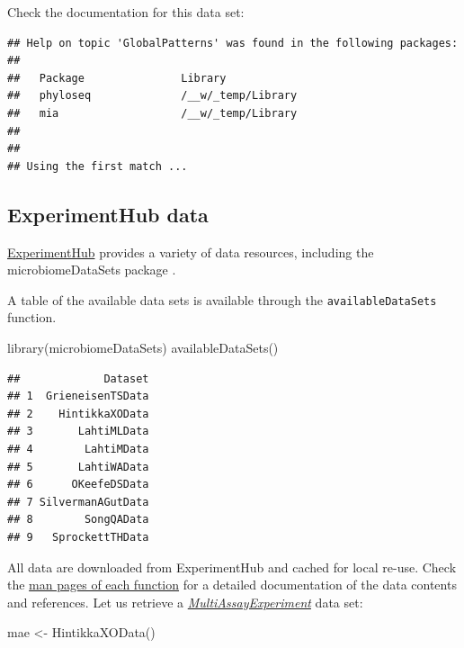 \documentclass[
]{book}
\newenvironment{Shaded}{\begin{snugshade}}{\end{snugshade}}
\newcommand{\FunctionTok}[1]{\textcolor[rgb]{0.00,0.00,0.00}{#1}}
\newcommand{\NormalTok}[1]{#1}
\newcommand{\OtherTok}[1]{\textcolor[rgb]{0.56,0.35,0.01}{#1}}
\begin{document}
Check the documentation for this data set:

\begin{verbatim}
## Help on topic 'GlobalPatterns' was found in the following packages:
## 
##   Package               Library
##   phyloseq              /__w/_temp/Library
##   mia                   /__w/_temp/Library
## 
## 
## Using the first match ...
\end{verbatim}

\hypertarget{experimenthub-data}{%
\subsection{ExperimentHub data}\label{experimenthub-data}}

\href{https://bioconductor.org/packages/release/bioc/vignettes/ExperimentHub/inst/doc/ExperimentHub.html}{ExperimentHub}
provides a variety of data resources, including the
microbiomeDataSets package \citep{Morgan2021, microlahti2021}.

A table of the available data sets is available through the \texttt{availableDataSets}
function.

\begin{Shaded}
\begin{Highlighting}[]
\FunctionTok{library}\NormalTok{(microbiomeDataSets)}
\FunctionTok{availableDataSets}\NormalTok{()}
\end{Highlighting}
\end{Shaded}

\begin{verbatim}
##             Dataset
## 1  GrieneisenTSData
## 2    HintikkaXOData
## 3       LahtiMLData
## 4        LahtiMData
## 5       LahtiWAData
## 6      OKeefeDSData
## 7 SilvermanAGutData
## 8        SongQAData
## 9   SprockettTHData
\end{verbatim}

All data are downloaded from ExperimentHub and cached for local
re-use. Check the \href{https://microbiome.github.io/microbiomeDataSets/reference/index.html}{man pages of each
function}
for a detailed documentation of the data contents and references. Let
us retrieve a \emph{\href{https://bioconductor.org/packages/3.15/MultiAssayExperiment}{MultiAssayExperiment}} data set:

\begin{Shaded}
\begin{Highlighting}[]
\NormalTok{mae }\OtherTok{\textless{}{-}} \FunctionTok{HintikkaXOData}\NormalTok{()}
\end{Highlighting}
\end{Shaded}
\end{document}
